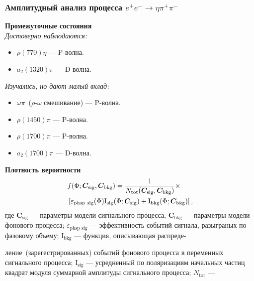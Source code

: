 \documentclass{beamer}
\begin{document}
\begin{frame}
  \frametitle{Амплитудный анализ процесса $e^+e^-\to\eta\pi^+\pi^-$}
  \begin{minipage}[t]{0.49\linewidth}
  \scriptsize
  \textbf{Промежуточные состояния}\\
  \textit{Достоверно наблюдаются:}
  \begin{itemize}
  \item {\scriptsize $\rho(770)\eta$ --- P-волна.} 
  \item {\scriptsize $a_2(1320)\pi$ --- D-волна.}
  \end{itemize}
  \textit{Изучались, но дают малый вклад:}
  \begin{itemize}
  \item {\scriptsize $\omega\pi$~($\rho$-$\omega$ смешивание) --- P-волна.}
  \item {\scriptsize $\rho(1450)\pi$ --- P-волна.}
  \item {\scriptsize $\rho(1700)\pi$ --- P-волна.}
  \item {\scriptsize $a_2(1700)\pi$ --- D-волна.}
  \end{itemize}
  \vspace{1em}%
  \textbf{Плотность вероятности}
  \vspace{-1em}%
   \begin{eqnarray*}
     \begin{split}
     \textstyle
       &f(\Phi; \bm{C}_{\text{sig}}, \bm{C}_{\text{bkg}}) =
     \frac{1}{N_{\text{tot}}(\bm{C}_{\text{sig}}, \bm{C}_{\text{bkg}})}\times\\
       &\left[ \varepsilon_{\text{phsp
    sig}}(\Phi)\text{I}_{\text{sig}}(\Phi; \bm{C}_{\text{sig}}) + \text{I}_{\text{bkg}}(\Phi;
         \bm{C}_{\text{bkg}}) \right],
     \end{split}
   \end{eqnarray*}
   где $\textstyle\bm{C}_{\text{sig}}$ --- параметры модели сигнального процесса,
   $\textstyle\bm{C}_{\text{bkg}}$ --- параметры модели фонового процесса;
   $\textstyle\varepsilon_{\text{phsp sig}}$ --- эффективность событий сигнала, разыграных по
   фазовому объему; $\textstyle{}\text{I}_{\text{bkg}}$ --- функция, описывающая распреде-
\end{minipage}
\begin{minipage}[t]{0.49\linewidth}
  \scriptsize
  ление~(зарегестрированных) событий фонового процесса в переменных сигнального
  процесса; $\textstyle{}\text{I}_{\text{sig}}$ --- усредненный по поляризациям начальных частиц
  квадрат модуля суммарной амплитуды сигнального процесса; $\textstyle{}N_{\text{tot}}$ ---

\end{minipage}
\end{frame}
\end{document}
